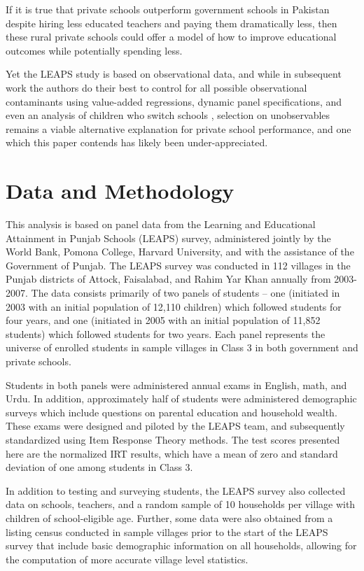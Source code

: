 \documentclass[12pt]{article}
\begin{document}
\begin{figure}[htb]
\begin{center}
	\end{center}
\end{figure}

If it is true that private schools outperform government schools in Pakistan despite hiring less educated teachers and paying them dramatically less, then these rural private schools could offer a model of how to improve educational outcomes while potentially spending less. 

Yet the LEAPS study is based on observational data, and while in subsequent work the authors do their best to control for all possible observational contaminants using value-added regressions, dynamic panel specifications, and even an analysis of children who switch schools \citep{Andrabi:2011hl}, selection on unobservables remains a viable alternative explanation for private school performance, and one which this paper contends has likely been under-appreciated. 


\section{Data and Methodology}\label{data}

This analysis is based on panel data from the Learning and Educational Attainment in Punjab Schools (LEAPS) survey, administered jointly by the World Bank, Pomona College, Harvard University, and with the assistance of the Government of Punjab. The LEAPS survey was conducted in 112 villages in the Punjab districts of Attock, Faisalabad, and Rahim Yar Khan annually from 2003-2007. The data consists primarily of two panels of students -- one (initiated in 2003 with an initial population of 12,110 children) which followed students for four years, and one (initiated in 2005 with an initial population of 11,852 students) which followed students for two years. Each panel represents the universe of enrolled students in sample villages in Class 3 in both government and private schools. 

Students in both panels were administered annual exams in English, math, and Urdu. In addition, approximately half of students were administered demographic surveys which include questions on parental education and household wealth. These exams were designed and piloted by the LEAPS team, and subsequently standardized using Item Response Theory methods. The test scores presented here are the normalized IRT results, which have a mean of zero and standard deviation of one among students in Class 3. 

In addition to testing and surveying students, the LEAPS survey also collected data on schools, teachers, and a random sample of 10 households per village with children of school-eligible age. Further, some data were also obtained from a listing census conducted in sample villages prior to the start of the LEAPS survey that include basic demographic information on all households, allowing for the computation of more accurate village level statistics.
\end{document}
